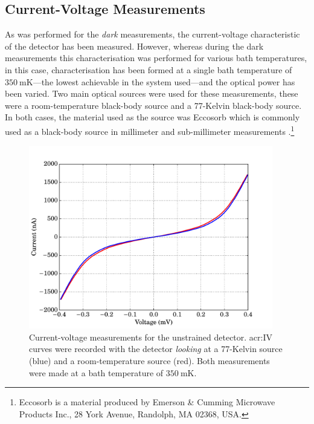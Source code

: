 \subsection{Current-Voltage Measurements}\label{ssec:opticalControlSi_IV}
As was performed for the \textit{dark} measurements, the current-voltage characteristic of the detector has been measured. However, whereas during the dark measurements this characterisation was performed for various bath temperatures, in this case, characterisation has been formed at a single bath temperature of $350~\mathrm{mK}$---the lowest achievable in the system used---and the optical power has been varied. Two main optical sources were used for these measurements, these were a room-temperature black-body source and a 77-Kelvin black-body source. In both cases, the material used as the source was Eccosorb which is commonly used as a black-body source in millimeter and sub-millimeter measurements \parencite[see, for example,][]{Mather1999}.\footnote{Eccosorb is a material produced by Emerson \& Cumming Microwave Products Inc., 28 York Avenue, Randolph, MA 02368, USA.} 
\begin{figure}[tb]
\begin{center}
\includegraphics[width = 0.95\textwidth]{figures/control_IVs_77_300}
\caption[Current-voltage measurements for an optically-loaded unstrained SiCEB]{Current-voltage measurements for the unstrained detector. \gls{acr:IV} curves were recorded with the detector \textit{looking} at a 77-Kelvin source (blue) and a room-temperature source (red). Both measurements were made at a bath temperature of $350~\mathrm{mK}$.}
\label{fig:controlIVs_optical}
\end{center}
\end{figure}
